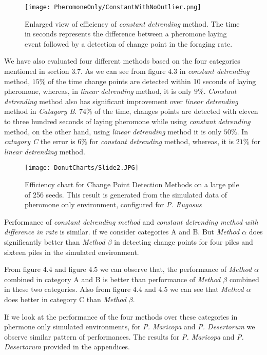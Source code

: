 \begin{figure}[H]
	\texttt{[image: PheromoneOnly/ConstantWithNoOutlier.png]}
	\caption{Enlarged view of efficiency of \textit{constant detrending} method. The time in seconds represents the difference between a pheromone laying event followed by a detection of change point in the foraging rate.}
\end{figure}


We have also evaluated four different methods based on the four categories mentioned in section $3.7$.
As we can see from figure $4.3$ in \textit{constant detrending} method, $15\%$ of the time change points are detected within 10 seconds of laying pheromone, whereas, in \textit{linear detrending} method, it is only $9\%$. \textit{Constant detrending} method also has significant improvement over \textit{linear detrending} method in \textit{Catagory B}. $74\%$ of the time, changes points are detected with eleven to three hundred seconds of laying pheromone while using \textit{constant detrending} method, on the other hand, using \textit{linear detrending} method it is only $50\%$. In \textit{catagory C} the error is $6\%$ for \textit{constant detrending} method, whereas, it is $21\%$ for \textit{linear detrending} method. \par
\begin{figure}[h]
	\texttt{[image: DonutCharts/Slide2.JPG]}
	\caption{Efficiency chart for Change Point Detection Methods on a large pile of 256 seeds. This result is generated from the simulated data of pheromone only environment, configured for \textit{P. Rugosus}}
\end{figure}
Performance of \textit{constant detrending method} and \textit{constant detrending method with difference in rate} is similar. if we consider categories A and B. But \textit{Method $\alpha$} does significantly better than \textit{Method $\beta$} in detecting change points for four piles and sixteen piles in the simulated environment.\par
From figure $4.4$ and figure $4.5$ we can observe that, the performance of \textit{Method $\alpha$} combined in category A and B is better than performance of \textit{Method $\beta$} combined in these two categories. Also from figure $4.4$ and $4.5$ we can see that \textit{Method $\alpha$} does better in category C than \textit{Method $\beta$}. \par
If we look at the performance of the four methods over these categories in phermone only simulated environments, for \textit{P. Maricopa} and \textit{P. Desertorum} we observe similar pattern of performances. The results for \textit{P. Maricopa} and \textit{P. Desertorum} provided in the appendices.\par   

